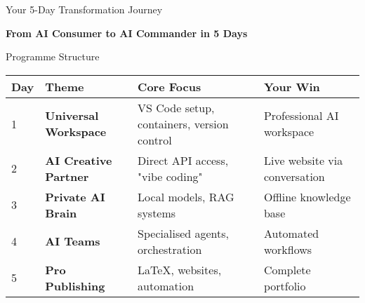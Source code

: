 \documentclass{beamer}
\newcommand{\highlight}[1]{\textcolor{aiblue}{\textbf{#1}}}
\begin{document}
\begin{frame}{Your 5-Day Transformation Journey}
\centering
{}
\vspace{1em}
\textbf{From AI Consumer to AI Commander in 5 Days}
\end{frame}

\begin{frame}{Programme Structure}
\footnotesize
\begin{tabular}{@{}lp{3.5cm}p{5.5cm}p{3cm}@{}}
\toprule
\textbf{Day} & \textbf{Theme} & \textbf{Core Focus} & \textbf{Your Win} \\
\midrule
1 & \highlight{Universal Workspace} & VS Code setup, containers, version control & Professional AI workspace \\
2 & \highlight{AI Creative Partner} & Direct API access, "vibe coding" & Live website via conversation \\
3 & \highlight{Private AI Brain} & Local models, RAG systems & Offline knowledge base \\
4 & \highlight{AI Teams} & Specialised agents, orchestration & Automated workflows \\
5 & \highlight{Pro Publishing} & LaTeX, websites, automation & Complete portfolio \\
\bottomrule
\end{tabular}
\end{frame}
\end{document}
